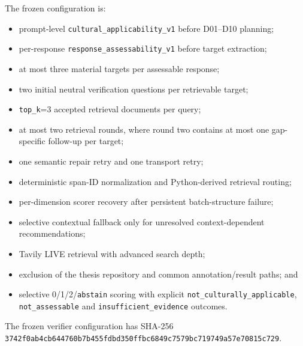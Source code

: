 The frozen configuration is:
\begin{itemize}
    \item prompt-level \texttt{cultural\_applicability\_v1} before D01--D10 planning;
    \item per-response \texttt{response\_assessability\_v1} before target extraction;
    \item at most three material targets per assessable response;
    \item two initial neutral verification questions per retrievable target;
    \item \texttt{top\_k}=3 accepted retrieval documents per query;
    \item at most two retrieval rounds, where round two contains at most one gap-specific follow-up per target;
    \item one semantic repair retry and one transport retry;
    \item deterministic span-ID normalization and Python-derived retrieval routing;
    \item per-dimension scorer recovery after persistent batch-structure failure;
    \item selective contextual fallback only for unresolved context-dependent recommendations;
    \item Tavily LIVE retrieval with advanced search depth;
    \item exclusion of the thesis repository and common annotation/result paths; and
    \item selective 0/1/2/\texttt{abstain} scoring with explicit \texttt{not\_culturally\_applicable}, \texttt{not\_assessable} and \texttt{insufficient\_evidence} outcomes.
\end{itemize}

The frozen verifier configuration has SHA-256
\texttt{3742f0ab4cb644760b7b455fdbd350ffbc6849c7579bc719749a57e70815c729}.

